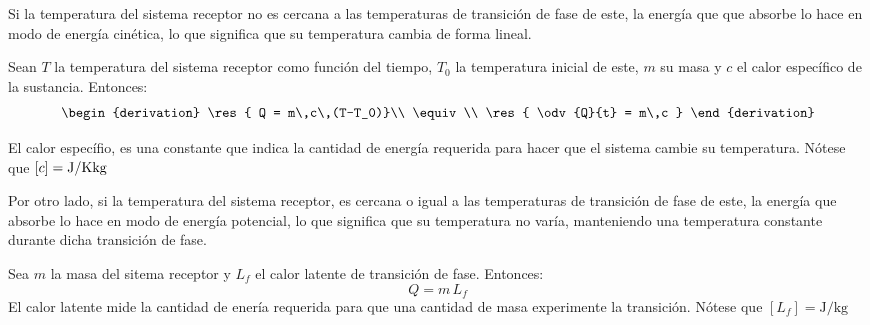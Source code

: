 \begin{center}
\end{center}

Si la temperatura del sistema receptor no es cercana a las temperaturas
de transición de fase de este, la energía que que absorbe lo hace en
modo de energía cinética, lo que significa que su temperatura cambia de
forma lineal.

Sean $T$ la temperatura del sistema receptor como función del tiempo,
$T_0$ la temperatura inicial de este, $m$ su masa y $c$ el calor
específico de la sustancia. Entonces:
\[
	\begin{derivation}
            \res{ Q = m\,c\,(T-T_0)}\\
		\equiv\\
		    \res{ \odv{Q}{t} = m\,c }
	\end{derivation}
\]

El calor específio, es una constante que indica la cantidad de energía
requerida para hacer que el sistema cambie su temperatura.
Nótese que $[c] = \si{\joule\per{\kelvin\kg}}$

Por otro lado, si la temperatura del sistema receptor, es cercana o
igual a las temperaturas de transición de fase de este, la energía que
absorbe lo hace en modo de energía potencial, lo que significa que su
temperatura no varía, manteniendo una temperatura constante durante
dicha transición de fase.

Sea $m$ la masa del sitema receptor y $L_f$ el calor latente de
transición de fase. Entonces:
\[Q = m\,L_f\]
El calor latente mide la cantidad de enería requerida para que una
cantidad de masa experimente la transición.
Nótese que $[L_f] = \si{\joule\per\kg}$